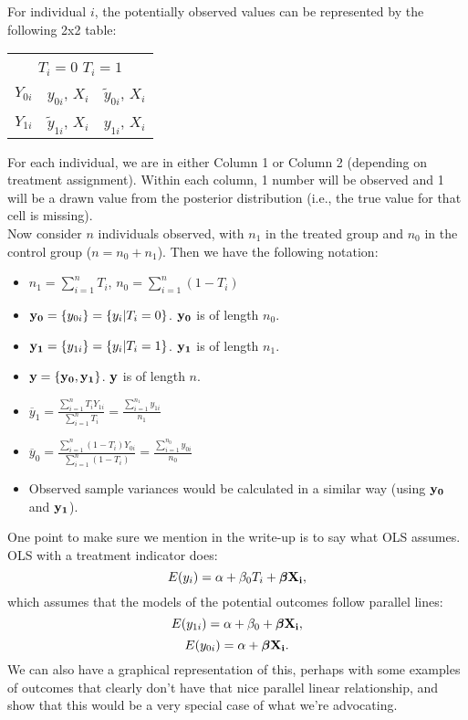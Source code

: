 \documentclass[oneside,letterpaper,titlepage,12pt]{article}
\begin{document}
For individual $i$, the potentially observed values can be represented by the following 2x2 table:

\begin{center}
\begin{tabular}{c|c|c|}
\multicolumn{3}{c}{\hspace*{.8cm} $T_i=0$ \hfill $T_i=1$} \\
\cline{2-3}
$Y_{0i}$ & $y_{0i}$, $X_i$ & $\tilde{y}_{0i}$, $X_i$ \\
\cline{2-3}
$Y_{1i}$ & $\tilde{y}_{1i}$, $X_i$ & $y_{1i}$, $X_i$ \\
\cline{2-3}
\end{tabular}
\end{center}
 
For each individual, we are in either Column 1 or Column 2 (depending on treatment assignment).  Within each column, 1 number will be observed and 1 will be a drawn
value from the posterior distribution (i.e., the true value for that cell is missing). \\


Now consider $n$ individuals observed, with $n_1$ in the treated group and $n_0$ in the control group ($n=n_0+n_1$).  Then we have the following notation:
\begin{itemize}
\item $n_1=\sum_{i=1}^n T_i$, $n_0=\sum_{i=1}^n (1-T_i)$
\item ${\bf y_0} = \{y_{0i}\} = \{y_{i}|T_i=0\}$.  ${\bf y_0}$ is of length $n_0$.
\item ${\bf y_1} = \{y_{1i}\} = \{y_{i}|T_i=1\}$.  ${\bf y_1}$ is of length $n_1$.
\item ${\bf y} = \{ {\bf y_0}, {\bf y_1}\}$.  ${\bf y}$ is of length $n$.
\item $\overline{y}_1 = \frac{\sum_{i=1}^n T_i Y_{1i}}{\sum_{i=1}^n T_i}=\frac{\sum_{i=1}^{n_1} y_{1i}}{n_1}$
\item $\overline{y}_0 = \frac{\sum_{i=1}^n (1-T_i) Y_{0i}}{\sum_{i=1}^n (1-T_i)}=\frac{\sum_{i=1}^{n_0} y_{0i}}{n_0}$
\item Observed sample variances would be calculated in a similar way (using ${\bf y_0}$ and ${\bf y_1}$).
\end{itemize}

One point to make sure we mention in the write-up is to say what OLS assumes.  OLS with a treatment indicator does:
$$E(y_i) = \alpha + \beta_0 T_i + {\boldsymbol \beta} {\bf X_i},$$
which assumes that the models of the potential outcomes follow parallel lines:
$$E(y_{1i}) = \alpha + \beta_0 + {\boldsymbol \beta} {\bf X_i},$$
$$E(y_{0i}) = \alpha + {\boldsymbol \beta} {\bf X_i}.$$
We can also have a graphical representation of this, perhaps with some examples of outcomes that clearly don't have that nice parallel linear relationship,
and show that this would be a very special case of what we're advocating.
\end{document}
